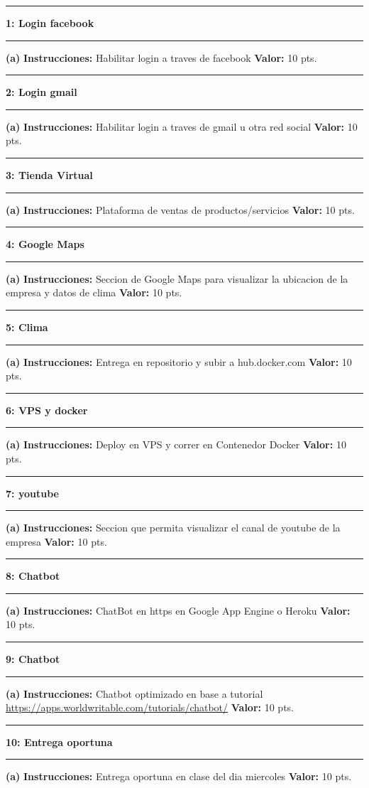\documentclass[11pt]{article}
\newcommand\question[2]{\vspace{.25in}\hrule\textbf{#1: #2}\vspace{.5em}\hrule\vspace{.10in}}
\renewcommand\part[1]{\vspace{.10in}\textbf{(#1)}}
\newcommand\algorithm{\vspace{.10in}\textbf{Instrucciones: }}
\newcommand\correctness{\vspace{.10in}\textbf{Valor: }}
\begin{document}
\raggedright

\newcommand\NAME{Adolfo Centeno}  
\newcommand\ADSOFTID{adsoft}     
\newcommand\HWNUM{1}              


\question{1}{Login facebook} 
\part{a} \algorithm  Habilitar login a traves de facebook
\correctness 10 pts.

\question{2}{Login gmail} 
\part{a} \algorithm  Habilitar login a traves de gmail u otra red social
\correctness 10 pts.

\question{3}{Tienda Virtual} 
\part{a} \algorithm  Plataforma de ventas de productos/servicios
\correctness 10 pts.

\question{4}{Google Maps} 
\part{a} \algorithm  Seccion de Google Maps para visualizar la ubicacion de la empresa y datos de clima
\correctness 10 pts.


\question{5}{Clima} 
\part{a} \algorithm  Entrega en repositorio y subir a hub.docker.com 
\correctness 10 pts.


\question{6}{VPS y docker} 
\part{a} \algorithm  Deploy en VPS y correr en Contenedor Docker
\correctness 10 pts.

\question{7}{youtube} 
\part{a} \algorithm  Seccion que permita visualizar el canal de youtube de la empresa
\correctness 10 pts.


\question{8}{Chatbot} 
\part{a} \algorithm  ChatBot en https en Google App Engine o Heroku
\correctness 10 pts.

\question{9}{Chatbot} 
\part{a} \algorithm  Chatbot optimizado en base a tutorial \url{https://apps.worldwritable.com/tutorials/chatbot/}
\correctness 10 pts.


\question{10}{Entrega oportuna} 
\part{a} \algorithm  Entrega oportuna en clase del dia miercoles
\correctness 10 pts.
\end{document}
